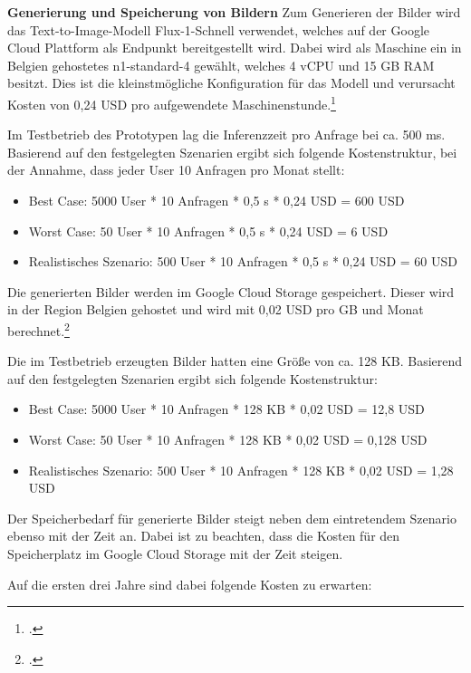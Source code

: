 \textbf{Generierung und Speicherung von Bildern}\newline
Zum Generieren der Bilder wird das Text-to-Image-Modell Flux-1-Schnell verwendet, welches auf der Google Cloud Plattform als Endpunkt bereitgestellt wird.
Dabei wird als Maschine ein in Belgien gehostetes n1-standard-4 gewählt, welches 4 \ac{vCPU} und 15 \ac{GB} \ac{RAM} besitzt.
Dies ist die kleinstmögliche Konfiguration für das Modell und verursacht Kosten von 0,24 \ac{USD} pro aufgewendete Maschinenstunde.\footcite{GoogleVertexAI2025}

Im Testbetrieb des Prototypen lag die Inferenzzeit pro Anfrage bei ca. 500 ms.
Basierend auf den festgelegten Szenarien ergibt sich folgende Kostenstruktur, bei der Annahme, dass jeder User 10 Anfragen pro Monat stellt:

\begin{itemize}
    \item Best Case: 5000 User * 10 Anfragen * 0,5 s * 0,24 \ac{USD} = 600 \ac{USD}
    \item Worst Case: 50 User * 10 Anfragen * 0,5 s * 0,24 \ac{USD} = 6 \ac{USD}
    \item Realistisches Szenario: 500 User * 10 Anfragen * 0,5 s * 0,24 \ac{USD} = 60 \ac{USD}
\end{itemize}

Die generierten Bilder werden im Google Cloud Storage gespeichert.
Dieser wird in der Region Belgien gehostet und wird mit 0,02 \ac{USD} pro \ac{GB} und Monat berechnet.\footcite{GoogleCloudStorage2025}

Die im Testbetrieb erzeugten Bilder hatten eine Größe von ca. 128 \ac{KB}.
Basierend auf den festgelegten Szenarien ergibt sich folgende Kostenstruktur:
\begin{itemize}
    \item Best Case: 5000 User * 10 Anfragen * 128 \ac{KB} * 0,02 \ac{USD} = 12,8 \ac{USD}
    \item Worst Case: 50 User * 10 Anfragen * 128 \ac{KB} * 0,02 \ac{USD} = 0,128 \ac{USD}
    \item Realistisches Szenario: 500 User * 10 Anfragen * 128 \ac{KB} * 0,02 \ac{USD} = 1,28 \ac{USD}
\end{itemize}

Der Speicherbedarf für generierte Bilder steigt neben dem eintretendem Szenario ebenso mit der Zeit an.
Dabei ist zu beachten, dass die Kosten für den Speicherplatz im Google Cloud Storage mit der Zeit steigen.

Auf die ersten drei Jahre sind dabei folgende Kosten zu erwarten:

